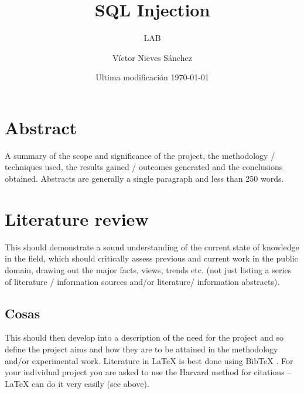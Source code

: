 \documentclass[bibliography=totocnumbered]{scrartcl}
\title{SQL Injection}
\subtitle{LAB}
\author{Víctor Nieves Sánchez }
\date{Ultima modificación \today{}}
\begin{document}
\maketitle

\tableofcontents

\newpage
\listoffigures

\newpage


\section{Abstract}
A summary of the scope and significance of the project, the methodology / techniques used, the results gained / outcomes generated and the conclusions obtained. Abstracts are generally a single paragraph and less than 250 words.


\section{Literature review}
This should demonstrate a sound understanding of the current state of knowledge in the field, which should critically assess previous and current work in the public domain, drawing out the major facts, views, trends etc. (not just listing a series of literature / information sources and/or literature/ information abstracts). 
\subsection{Cosas}
This should then develop into a description of the need for the project and so define the
project aims and how they are to be attained in the methodology and/or experimental work. Literature in \LaTeX{} \citep{ardell05} is best done using BibTeX \citep{ashbyjones, hk}. For your individual project you are asked to use the Harvard method for citations -- \LaTeX{} can do it very easily (see above).

\newpage

\end{document}

